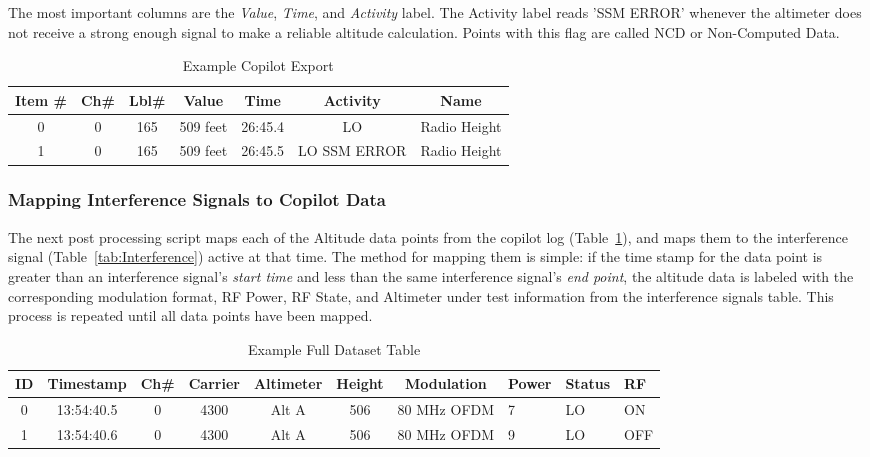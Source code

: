 The most important columns are the \textit{Value}, \textit{Time}, and \textit{Activity} label. The Activity label reads 'SSM ERROR'  whenever the altimeter does not receive a strong enough signal to make a reliable altitude calculation. Points with this flag are called NCD or Non-Computed Data. 
\begin{table}[]
\centering
\begin{tabular}{ccccccc}

\hline
Item \# & Ch\# & Lbl\# & Value    & Time    & Activity      & Name         \\ \hline
0       & 0    & 165   & 509 feet & 26:45.4 & LO            & Radio Height \\
1       & 0    & 165   & 509 feet & 26:45.5 & LO SSM ERROR & Radio Height \\ \hline
\end{tabular}
\caption{Example Copilot Export}
\label{tab:Copilot}
\end{table}
\subsubsection{Mapping Interference Signals to Copilot Data}
The next post processing script maps each of the Altitude data points from the copilot log (Table~\ref{tab:Copilot}), and maps them to the interference signal (Table~\ref{tab:Interference}) active at that time. The method for mapping them is simple: if the time stamp for the data point is greater than an interference signal's \textit{start time} and less than the same interference signal's \textit{end point}, the altitude data is labeled with the corresponding modulation format, RF Power, RF State, and Altimeter under test information from the interference signals table. This process is repeated until all data points have been mapped. 

\begin{table}[]
\centering
\begin{tabular}{@{}ccccccclll@{}}

\toprule
ID & Timestamp  & Ch\# & Carrier& Altimeter & Height & Modulation  & Power& Status & RF \\ \midrule
0  & 13:54:40.5 & 0    & 4300              & Alt A     & 506             & 80 MHz OFDM & 7               & LO     & ON       \\
1  & 13:54:40.6 & 0    & 4300              & Alt A     & 506             & 80 MHz OFDM & 9               & LO     & OFF      \\ \bottomrule
\end{tabular}
\caption{Example Full Dataset Table}
\label{tab:Full}
\end{table}
